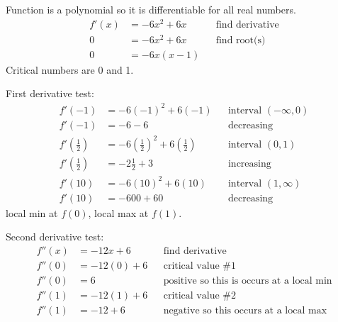 \documentclass{article}
\begin{document}
\begin{description}
\begin{description}
                Function is a polynomial so it is differentiable for all real numbers.
                \begin{align*}
                  f'(x) & = -6x^2 + 6x &  & \text{find derivative} \\[2em]
                  0     & = -6x^2 + 6x &  & \text{find root(s)}    \\
                  0     & = -6x(x - 1)
                \end{align*}
                Critical numbers are 0 and 1.

                First derivative test:
                \begin{align*}
                  f'(-1)          & = -6(-1)^2 + 6(-1)                                         &  & \text{interval $(-\infty, 0)$} \\
                  f'(-1)          & = -6 - 6                                                   &  & \text{decreasing}              \\[2em]
                  f'(\frac{1}{2}) & = -6\left(\frac{1}{2}\right)^2 + 6\left(\frac{1}{2}\right) &  & \text{interval $(0, 1)$}       \\
                  f'(\frac{1}{2}) & = -2\frac{1}{2}  +   3                                     &  & \text{increasing}              \\[2em]
                  f'(10)          & = -6(10)^2 + 6(10)                                         &  & \text{interval $(1, \infty)$}  \\
                  f'(10)          & = -600 + 60                                                &  & \text{decreasing}
                \end{align*}
                local min at $f(0)$, local max at $f(1)$.

                Second derivative test:
                \begin{align*}
                  f''(x) & = -12x + 6   &  & \text{find derivative}                           \\[2em]
                  f''(0) & = -12(0) + 6 &  & \text{critical value \#1}                        \\
                  f''(0) & = 6          &  & \text{positive so this is occurs at a local min} \\[2em]
                  f''(1) & = -12(1) + 6 &  & \text{critical value \#2}                        \\
                  f''(1) & = -12 + 6    &  & \text{negative so this occurs at a local max}
                \end{align*}


\end{description}
\end{description}
\end{document}
